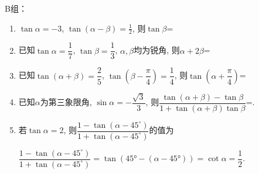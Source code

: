 B组：
\begin{enumerate}
\item $\tan\alpha=-3$, $\tan\left(\alpha-\beta\right)=\frac{1}{2}$, 则$\tan\beta$=
\item 已知$\tan\alpha=\dfrac{1}{7}$, $\tan\beta=\dfrac{1}{3}$, $\alpha,\beta$均为锐角, 则$\alpha+2\beta$=
\item 已知$\tan\left(\alpha+\beta\right)=\dfrac{2}{5}$, $\tan\left(\beta-\dfrac{\pi}{4}\right)=\dfrac{1}{4}$, 则$\tan\left(\alpha+\dfrac{\pi}{4}\right)$=
\item 已知$\alpha$为第三象限角, $\sin\alpha=-\dfrac{\sqrt3}{3}$, 则$\dfrac{\tan\left(\alpha+\beta\right)-\tan\beta}{1+\tan\left(\alpha+\beta\right)\tan\beta}$=. 
\item 若$\tan\alpha=2$, 则$\dfrac{1-\tan\left(\alpha-45^{\circ}\right)}{1+\tan\left(\alpha-45^{\circ}\right)}$的值为
\begin{jieda}
$\dfrac{1-\tan\left(\alpha-45^{\circ}\right)}{1+\tan\left(\alpha-45^{\circ}\right)}=\tan\left(\ang{45}-\left(\alpha-\ang{45}\right)\right)=\cot\alpha=\dfrac{1}{2}$. 
\end{jieda}



\end{enumerate}
